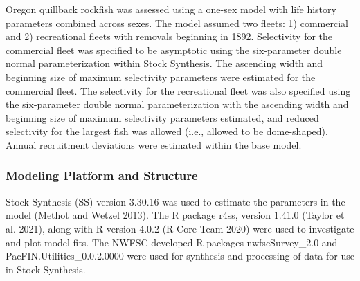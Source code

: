 \documentclass[11pt,
  english,
  a4paper,
]{article}
\begin{document}
\leavevmode\tagmcend\tagstructend


Oregon quillback rockfish was assessed using a one-sex model with life history parameters combined across sexes. The model assumed two fleets: 1) commercial and 2) recreational fleets with removals beginning in 1892. Selectivity for the commercial fleet was specified to be asymptotic using the six-parameter double normal parameterization within Stock Synthesis. The ascending width and beginning size of maximum selectivity parameters were estimated for the commercial fleet. The selectivity for the recreational fleet was also specified using the six-parameter double normal parameterization with the ascending width and beginning size of maximum selectivity parameters estimated, and reduced selectivity for the largest fish was allowed (i.e., allowed to be dome-shaped). Annual recruitment deviations were estimated within the base model.

\leavevmode\tagmcend\tagstructend\par


\hypertarget{modeling-platform-and-structure}{%
\subsubsection{Modeling Platform and Structure}\label{modeling-platform-and-structure}}

\leavevmode\tagmcend\tagstructend


Stock Synthesis (SS) version 3.30.16 was used to estimate the parameters in the model {(Methot and Wetzel 2013)\leavevmode\tagmcend\tagstructend}. The R package r4ss, version 1.41.0 {(Taylor et al. 2021)\leavevmode\tagmcend\tagstructend}, along with R version 4.0.2 {(R Core Team 2020)\leavevmode\tagmcend\tagstructend} were used to investigate and plot model fits. The NWFSC developed R packages nwfscSurvey\_2.0 and PacFIN.Utilities\_0.0.2.0000 were used for synthesis and processing of data for use in Stock Synthesis.

\leavevmode\tagmcend\tagstructend\par

\end{document}
